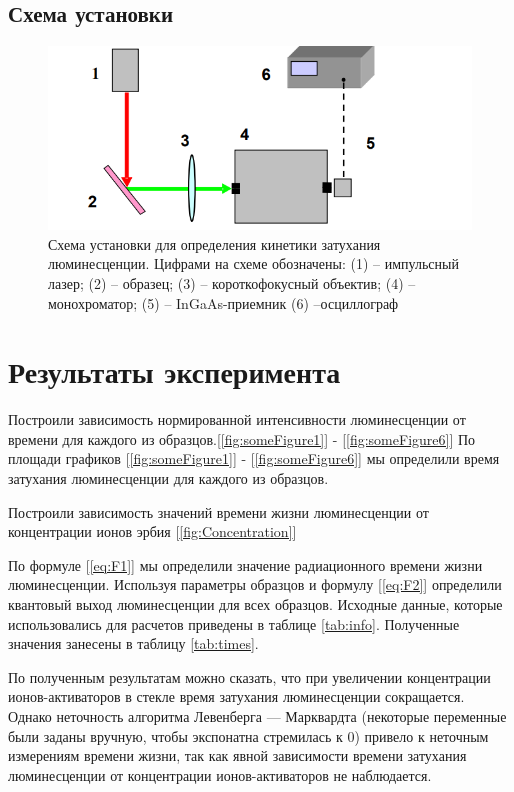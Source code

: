 \subsection{Схема установки}\label{subsec:schemes}
\begin{figure}[H]
        \centering
        \includegraphics[width=0.7\columnwidth]{figures/Scheme}%
        \caption{Схема установки для определения кинетики затухания
люминесценции. Цифрами на схеме обозначены: (1) – импульсный лазер; (2)
– образец; (3) – короткофокусный объектив; (4) – монохроматор; (5) –
InGaAs-приемник (6) –осциллограф}
		\label{fig:Scheme}
\end{figure}
\section{Результаты эксперимента}\label{sec:results}

Построили зависимость нормированной интенсивности
люминесценции от времени для каждого из образцов.[\ref{fig:someFigure1}] - [\ref{fig:someFigure6}]
По площади графиков [\ref{fig:someFigure1}] - [\ref{fig:someFigure6}] мы определили время затухания люминесценции для каждого из образцов.

Построили зависимость значений времени жизни люминесценции
от концентрации ионов эрбия [\ref{fig:Concentration}]

По формуле [\ref{eq:F1}] мы определили значение радиационного времени
жизни люминесценции.
Используя параметры образцов и формулу [\ref{eq:F2}] определили квантовый выход люминесценции для всех образцов.
Исходные данные, которые использовались для расчетов приведены в таблице \ref{tab:info}.
Полученные значения занесены в таблицу \ref{tab:times}.

По полученным результатам можно сказать, что при увеличении концентрации ионов-активаторов в стекле время затухания люминесценции сокращается.
Однако неточность алгоритма Левенберга — Марквардта (некоторые переменные были заданы вручную, чтобы экспонатна стремилась к 0) привело к неточным измерениям времени жизни,
так как явной зависимости времени затухания люминесценции от концентрации ионов-активаторов не наблюдается.

